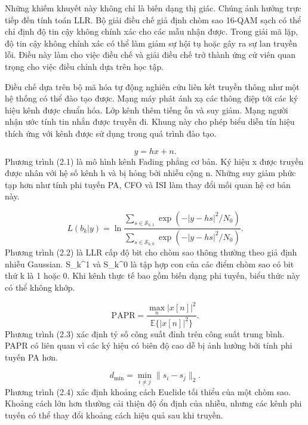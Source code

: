 Những khiếm khuyết này không chỉ là biến dạng thị giác. Chúng ảnh hưởng trực tiếp đến tính toán LLR. Bộ giải điều chế giả định chòm sao 16-QAM sạch có thể chỉ định độ tin cậy không chính xác cho các mẫu nhận được. Trong giải mã lặp, độ tin cậy không chính xác có thể làm giảm sự hội tụ hoặc gây ra sự lan truyền lỗi. Điều này làm cho việc điều chế và giải điều chế trở thành ứng cử viên quan trọng cho việc điều chỉnh dựa trên học tập.

Điều chế dựa trên bộ mã hóa tự động nghiên cứu liên kết truyền thông như một hệ thống có thể đào tạo được. Mạng máy phát ánh xạ các thông điệp tới các ký hiệu kênh được chuẩn hóa. Lớp kênh thêm tiếng ồn và suy giảm. Mạng người nhận ước tính tin nhắn được truyền đi. Khung này cho phép biểu diễn tín hiệu thích ứng với kênh được sử dụng trong quá trình đào tạo.

\begin{equation}
y=hx+n.
\end{equation}
Phương trình (2.1) là mô hình kênh Fading phẳng cơ bản. Ký hiệu x được truyền được nhân với hệ số kênh h và bị hỏng bởi nhiễu cộng n. Những suy giảm phức tạp hơn như tính phi tuyến PA, CFO và ISI làm thay đổi mối quan hệ cơ bản này.

\begin{equation}
L(b_k|y)=\ln\frac{\sum_{s\in\mathcal{S}_{k,1}}\exp(-|y-hs|^2/N_0)}
{\sum_{s\in\mathcal{S}_{k,0}}\exp(-|y-hs|^2/N_0)}.
\end{equation}
Phương trình (2.2) là LLR cấp độ bit cho chòm sao thông thường theo giả định nhiễu Gaussian. S\_k\textasciicircum{}1 và S\_k\textasciicircum{}0 là tập hợp con của các điểm chòm sao có bit thứ k là 1 hoặc 0. Khi kênh thực tế bao gồm biến dạng phi tuyến, biểu thức này có thể không khớp.

\begin{equation}
\mathrm{PAPR}=\frac{\max_n |x[n]|^2}{\mathbb{E}\{|x[n]|^2\}}.
\end{equation}
Phương trình (2.3) xác định tỷ số công suất đỉnh trên công suất trung bình. PAPR có liên quan vì các ký hiệu có biên độ cao dễ bị ảnh hưởng bởi tính phi tuyến PA hơn.

\begin{equation}
d_{\min}=\min_{i\ne j}\|s_i-s_j\|_2.
\end{equation}
Phương trình (2.4) xác định khoảng cách Euclide tối thiểu của một chòm sao. Khoảng cách lớn hơn thường cải thiện độ ổn định của nhiễu, nhưng các kênh phi tuyến có thể thay đổi khoảng cách hiệu quả sau khi truyền.

